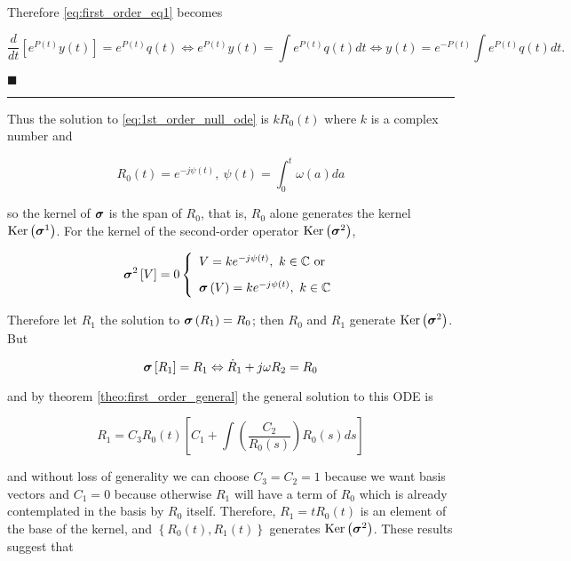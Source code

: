 	Therefore \eqref{eq:first_order_eq1} becomes

\begin{equation} \dfrac{d}{dt}\left[e^{P(t)}y(t)\right] = e^{P(t)}q(t) \Leftrightarrow e^{P(t)}y(t) = \int e^{P(t)}q(t)dt \Leftrightarrow y(t) = e^{-P(t)}\int e^{P(t)}q(t)dt. \label{eq:first_order_eq3}\end{equation}

\hfill$\blacksquare$
\vspace{5mm}
\hrule
\vspace{5mm} %

	Thus the solution to \eqref{eq:1st_order_null_ode} is $kR_0(t)$ where $k$ is a complex number and

\begin{equation} R_0\left(t\right) = e^{-j\psi(t)},\ \psi(t) = \int_{0}^{t} \omega(a)da\end{equation}

	\noindent so the kernel of $\boldsymbol{\sigma}$ is the span of $R_0$, that is, $R_0$ alone generates the kernel $\operatorname{Ker}\left(\boldsymbol{\sigma}^1\right)$. For the kernel of the second-order operator $\operatorname{Ker}\left(\boldsymbol{\sigma}^2\right)$,

\begin{equation} \boldsymbol{\sigma}^2\left[V\right] = 0 \left\{\begin{array}{l} V = ke^{-j\psi(t)},\ k\in\mathbb{C} \text{ or } \\[3mm] \boldsymbol{\sigma}\left(V\right) = ke^{-j\psi(t)},\ k\in\mathbb{C} \end{array}\right. \end{equation}

	Therefore let $R_1$ the solution to $\boldsymbol{\sigma}\left(R_1\right) = R_0$; then $R_0$ and $R_1$ generate $\operatorname{Ker}\left(\boldsymbol{\sigma}^2\right)$. But

\begin{equation} \boldsymbol{\sigma}\left[R_1\right] = R_1 \Leftrightarrow \dot{R}_1 + j\omega R_2 = R_0 \end{equation}

	\noindent and by theorem \ref{theo:first_order_general} the general solution to this ODE is

\begin{equation} R_1 = C_3R_0(t) \left[C_1 + \int \left(\dfrac{C_2}{R_0(s)}\right) R_0(s)ds\right] \end{equation}

	\noindent and without loss of generality we can choose $C_3 = C_2 = 1$ because we want basis vectors and $C_1 = 0$ because otherwise $R_1$ will have a term of $R_0$ which is already contemplated in the basis by $R_0$ itself. Therefore, $R_1 = tR_0(t)$ is an element of the base of the kernel, and $\left\{R_0(t),R_1(t)\right\}$ generates $\operatorname{Ker}\left(\boldsymbol{\sigma}^{2}\right)$. These results suggest that

